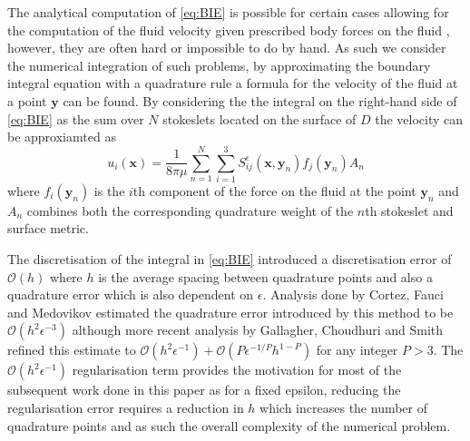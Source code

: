 The analytical computation of \cref{eq:BIE} is possible for certain cases allowing for the computation of the fluid velocity given prescribed body forces on the fluid \cite{Walker2020AFilaments,Zhao2021RegularizedFlow,Ohm2021RemarksTheory,Zhao2019}, however, they are often hard or impossible to do by hand. As such we consider the numerical integration of such problems, by approximating the boundary integral equation with a quadrature rule a formula for the velocity of the fluid at a point $\bm{y}$ can be found. By considering the the integral on the right-hand side of \cref{eq:BIE} as the sum over $N$ stokeslets located on the surface of $D$ the velocity can be approxiamted as
\begin{equation}
\label{eq:Stokesletsum}
    u_{i}\left(\bm{x}\right)=\frac{1}{8 \pi \mu} \sum_{n=1}^{N} \sum_{i=1}^{3} S_{i j}^{\epsilon}\left(\bm{x}, {\bm{y}}_{n}\right) {f}_{j}({\bm{y}}_{n}) A_{n}
\end{equation}
where ${f}_{i}({\bm{y}}_n)$ is the $i$th component of the force on the fluid at the point ${\bm{y}}_n$ and $A_n$ combines both the corresponding quadrature weight of the $n$th stokeslet and surface metric.

The discretisation of the integral in \cref{eq:BIE} introduced a discretisation error of $\mathcal{O}(h)$ where $h$ is the average spacing between quadrature points and also a quadrature error which is also dependent on $\epsilon$. Analysis done by Cortez, Fauci and Medovikov \cite{Cortez2005} estimated the quadrature error introduced by this method to be $\mathcal{O}(h^2\epsilon^{-3})$ although more recent analysis by Gallagher, Choudhuri and Smith \cite{Gallagher2019SharpEquation} refined this estimate to $\mathcal{O}(h^2\epsilon^{-1}) + \mathcal{O}(P\epsilon^{-1/P} h^{1-P})$ for any integer $P>3$. The $\mathcal{O}(h^2\epsilon^{-1})$ regularisation term provides the motivation for most of the subsequent work done in this paper as for a fixed epsilon, reducing the regularisation error requires a reduction in $h$ which increases the number of quadrature points and as such the overall complexity of the numerical problem. 

